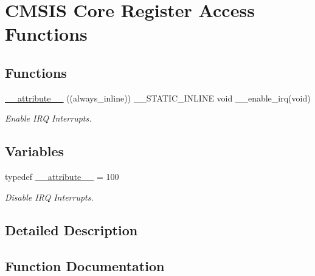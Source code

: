 \hypertarget{group__CMSIS__Core__RegAccFunctions}{}\section{C\+M\+S\+IS Core Register Access Functions}
\label{group__CMSIS__Core__RegAccFunctions}
\subsection*{Functions}
\begin{DoxyCompactItemize}
\item 
\mbox{\hyperlink{group__CMSIS__Core__RegAccFunctions_ga671b4fa3b3ab3dbc685a5473f3fc76aa}{\+\_\+\+\_\+attribute\+\_\+\+\_\+}} ((always\+\_\+inline)) \+\_\+\+\_\+\+S\+T\+A\+T\+I\+C\+\_\+\+I\+N\+L\+I\+NE void \+\_\+\+\_\+enable\+\_\+irq(void)
\begin{DoxyCompactList}\small\item\em Enable I\+RQ Interrupts. \end{DoxyCompactList}\end{DoxyCompactItemize}
\subsection*{Variables}
\begin{DoxyCompactItemize}
\item 
typedef \mbox{\hyperlink{group__CMSIS__Core__RegAccFunctions_ga64f4b781c8a7c676397f725a01427270}{\+\_\+\+\_\+attribute\+\_\+\+\_\+}} = 100
\begin{DoxyCompactList}\small\item\em Disable I\+RQ Interrupts. \end{DoxyCompactList}\end{DoxyCompactItemize}


\subsection{Detailed Description}


\subsection{Function Documentation}
\mbox{\label{group__CMSIS__Core__RegAccFunctions_ga671b4fa3b3ab3dbc685a5473f3fc76aa}} 
